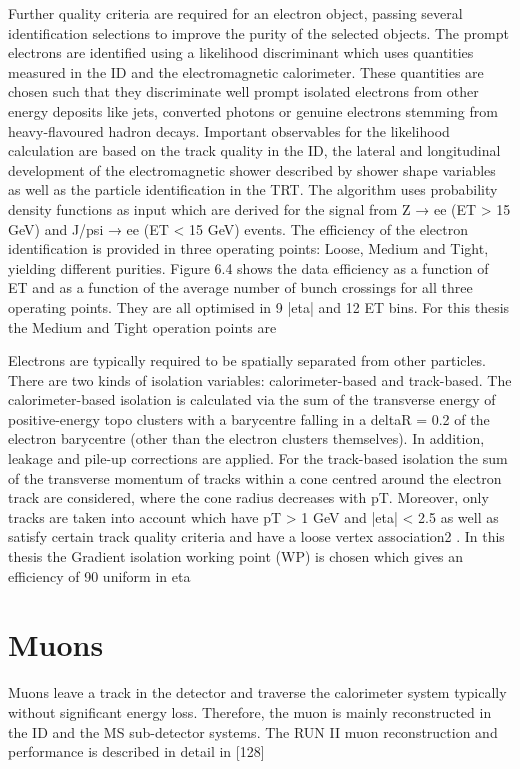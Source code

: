 Further quality criteria are required for an electron object, passing several identification selections
to improve the purity of the selected objects. The prompt electrons are identified using a likelihood
discriminant which uses quantities measured in the ID and the electromagnetic calorimeter. These
quantities are chosen such that they discriminate well prompt isolated electrons from other energy
deposits like jets, converted photons or genuine electrons stemming from heavy-flavoured hadron
decays. Important observables for the likelihood calculation are based on the track quality in the ID,
the lateral and longitudinal development of the electromagnetic shower described by shower shape
variables as well as the particle identification in the TRT. The algorithm uses probability density
functions as input which are derived for the signal from Z → ee (ET > 15 GeV) and J/psi → ee
(ET < 15 GeV) events.
The efficiency of the electron identification is provided in three operating points: Loose, Medium
and Tight, yielding different purities. Figure 6.4 shows the data efficiency as a function of ET and
as a function of the average number of bunch crossings for all three operating points. They are
all optimised in 9 |eta| and 12 ET bins. For this thesis the Medium and Tight operation points are

Electrons are typically required to be spatially separated from other particles. There are two kinds of
isolation variables: calorimeter-based and track-based.
The calorimeter-based isolation is calculated via the sum of the transverse energy of positive-energy
topo clusters with a barycentre falling in a deltaR = 0.2 of the electron barycentre (other than the
electron clusters themselves). In addition, leakage and pile-up corrections are applied.
For the track-based isolation the sum of the transverse momentum of tracks within a cone centred
around the electron track are considered, where the cone radius decreases with pT. Moreover, only
tracks are taken into account which have pT > 1 GeV and |eta| < 2.5 as well as satisfy certain track
quality criteria and have a loose vertex association2
. In this thesis the Gradient isolation working
point (WP) is chosen which gives an efficiency of 90%
uniform in eta

\section{Muons}

Muons leave a track in the detector and traverse the calorimeter system typically without significant
energy loss. Therefore, the muon is mainly reconstructed in the ID and the MS sub-detector systems.
The RUN II muon reconstruction and performance is described in detail in [128]

